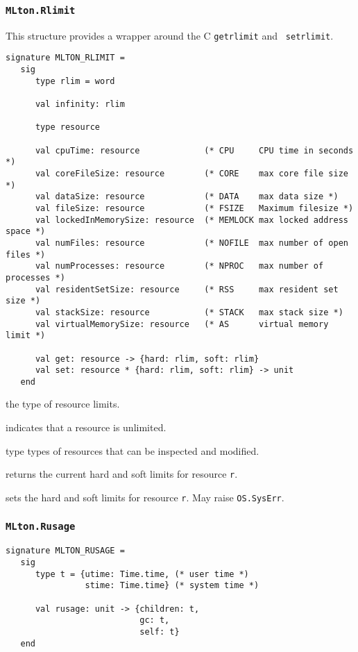 \subsubsection{\tt MLton.Rlimit}
This structure provides a wrapper around the C {\tt getrlimit} and {\tt
setrlimit}.
\begin{verbatim}
signature MLTON_RLIMIT =
   sig
      type rlim = word
               
      val infinity: rlim

      type resource
               
      val cpuTime: resource             (* CPU     CPU time in seconds *)
      val coreFileSize: resource        (* CORE    max core file size *)
      val dataSize: resource            (* DATA    max data size *)
      val fileSize: resource            (* FSIZE   Maximum filesize *)
      val lockedInMemorySize: resource  (* MEMLOCK max locked address space *)
      val numFiles: resource            (* NOFILE  max number of open files *)  
      val numProcesses: resource        (* NPROC   max number of processes *)
      val residentSetSize: resource     (* RSS     max resident set size *)
      val stackSize: resource           (* STACK   max stack size *)
      val virtualMemorySize: resource   (* AS      virtual memory limit *)
      
      val get: resource -> {hard: rlim, soft: rlim}
      val set: resource * {hard: rlim, soft: rlim} -> unit
   end
\end{verbatim}

\begin{description}
the type of resource limits.

indicates that a resource is unlimited.

type types of resources that can be inspected and modified.

returns the current hard and soft limits for resource {\tt r}.

sets the hard and soft limits for resource {\tt r}.  May raise {\tt OS.SysErr}.
\end{description}

\subsubsection{\tt MLton.Rusage}
\begin{verbatim}
signature MLTON_RUSAGE =
   sig
      type t = {utime: Time.time, (* user time *)
                stime: Time.time} (* system time *)
         
      val rusage: unit -> {children: t,
                           gc: t,
                           self: t}
   end
\end{verbatim}

